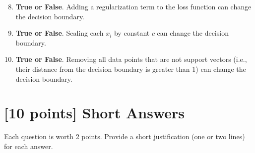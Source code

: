 \documentclass{article}
\newif\ifsolutions
\newenvironment{labelledanswer}{{\bf Answer:} \sf }{}%
\newcommand{\answer}[2]
{{
\ifsolutions
\begin{labelledanswer}
\color{red} 
#2
\end{labelledanswer}
\else
#1
\fi
}}
\begin{document}
\begin{enumerate}

\setcounter{enumi}{7}

\item \textbf{True or False}. Adding a regularization term to the loss function can change the decision boundary.

\answer{}{}

\item \textbf{True or False}. Scaling each $x_i$ by constant $c$ can change the decision boundary.

\answer{}{}

\item \textbf{True or False}. Removing all data points that are not support vectors (i.e., their distance from the decision boundary is greater than $1$) can change the decision boundary.

\answer{}{}

\end{enumerate}

\clearpage

\section{[10 points] Short Answers}

Each question is worth 2 points. Provide a short justification (one or two lines) for each answer.
\end{document}
